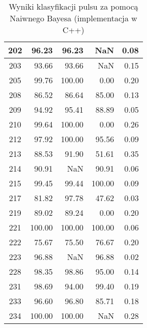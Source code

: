 \begin{table}
\begin{tabular}{|c|r|r|r|r|}
		\hline
		202 & 96.23      & 96.23      & NaN        & 0.08       \\
		\hline
		203 & 93.66      & 93.66      & NaN        & 0.15       \\
		\hline
		205 & 99.76      & 100.00     & 0.00       & 0.20       \\
		\hline
		208 & 86.52      & 86.64      & 85.00      & 0.13       \\
		\hline
		209 & 94.92      & 95.41      & 88.89      & 0.05       \\
		\hline
		210 & 99.64      & 100.00     & 0.00       & 0.26       \\
		\hline
		212 & 97.92      & 100.00     & 95.56      & 0.09       \\
		\hline
		213 & 88.53      & 91.90      & 51.61      & 0.35       \\
		\hline
		214 & 90.91      & NaN        & 90.91      & 0.06       \\
		\hline
		215 & 99.45      & 99.44      & 100.00     & 0.09       \\
		\hline
		217 & 81.82      & 97.78      & 47.62      & 0.03       \\
		\hline
		219 & 89.02      & 89.24      & 0.00       & 0.20       \\
		\hline
		221 & 100.00     & 100.00     & 100.00     & 0.06       \\
		\hline
		222 & 75.67      & 75.50      & 76.67      & 0.20       \\
		\hline
		223 & 96.88      & NaN        & 96.88      & 0.02       \\
		\hline
		228 & 98.35      & 98.86      & 95.00      & 0.14       \\
		\hline
		231 & 98.69      & 94.00      & 99.40      & 0.19       \\
		\hline
		233 & 96.60      & 96.80      & 85.71      & 0.18       \\
		\hline
		234 & 100.00     & 100.00     & NaN        & 0.28       \\
    \hline
	\end{tabular}
	\caption{Wyniki klasyfikacji pulsu za pomocą Naiwnego Bayesa (implementacja w C++)}
	\label{tab:skutecznosc}	
\end{table}